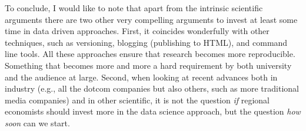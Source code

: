 \documentclass[fleqn,10pt]{SelfArx} %
\begin{document}
To conclude, I would like to note that apart from the intrinsic scientific
arguments there are two other very compelling arguments to invest at least some
time in data driven approaches. First, it coincides wonderfully with other
techniques, such as versioning, blogging (publishing to HTML), and command line
tools. All these approaches ensure that research becomes more reproducible.
Something that becomes more and more a hard requirement by both university and
the audience at large. Second, when looking at recent advances both in industry
(e.g., all the dotcom companies but also others, such as more traditional media
companies) and in other scientific, it is not the question \emph{if} regional economists
should invest more in the data science approach, but the question \emph{how
  soon} can we start.  


\printbibliography

\end{document}
